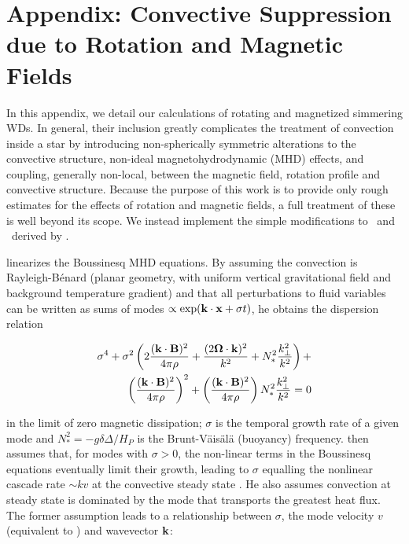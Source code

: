 \section{Appendix: Convective Suppression due to Rotation and Magnetic Fields}
\label{sec:c5_suppression}

In this appendix, we detail our calculations of rotating and magnetized simmering WDs.  In general, their inclusion greatly complicates the treatment of convection inside a star by introducing non-spherically symmetric alterations to the convective structure, non-ideal magnetohydrodynamic (MHD) effects, and coupling, generally non-local, between the magnetic field, rotation profile and convective structure.  Because the purpose of this work is to provide only rough estimates for the effects of rotation and magnetic fields, a full treatment of these is well beyond its scope.  We instead implement the simple modifications to \deltanab\ and \vconv\ derived by \citeal{stev79}.

\citeal{stev79} linearizes the Boussinesq MHD equations.  By assuming the convection is Rayleigh-B\'{e}nard (planar geometry, with uniform vertical gravitational field and background temperature gradient) and that all perturbations to fluid variables can be written as sums of modes $\propto\exp({\bf k}\cdot{\bf x} + \sigma t)$, he obtains the dispersion relation

\begin{eqnarray}
\sigma^4 + \sigma^2\left(2\frac{({\bf k}\cdot{\bf B})^2}{4\pi\rho} + \frac{(2\boldsymbol{\Omega}\cdot{\bf k})^2}{k^2} + N_*^2\frac{k_\perp^2}{k^2}\right) + \nonumber \\
\left(\frac{({\bf k}\cdot{\bf B})^2}{4\pi\rho}\right)^2 + \left(\frac{({\bf k}\cdot{\bf B})^2}{4\pi\rho}\right)N_*^2\frac{k_\perp^2}{k^2} = 0
\label{eq:c5_stev79dispersion}
\end{eqnarray}

\noindent in the limit of zero magnetic dissipation; $\sigma$ is the temporal growth rate of a given mode and $N_*^2 = -g\delta\Delta/H_P$ is the Brunt-V\"{a}is\"{a}l\"{a} (buoyancy) frequency.  \citeal{stev79} then assumes that, for modes with $\sigma > 0$, the non-linear terms in the Boussinesq equations eventually limit their growth, leading to $\sigma$ equalling the nonlinear cascade rate $\sim kv$ at the convective steady state \citep{barkdl14}.  He also assumes convection at steady state is dominated by the mode that transports the greatest heat flux.  The former assumption leads to a relationship between $\sigma$, the mode velocity $v$ (equivalent to \vconv) and wavevector ${\bf k}$:

